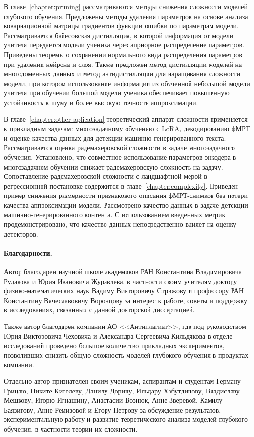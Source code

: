 В главе~\ref{chapter:pruning} рассматриваются методы снижения сложности моделей глубокого обучения.
Предложены методы удаления параметров на основе анализа ковариационной матрицы градиентов функции ошибки по параметрам модели.
Рассматривается байесовская дистилляция, в которой информация от модели учителя передается модели ученика через априорное распределение параметров. Приведены теоремы о сохранении нормального вида распределения параметров при удалении нейрона и слоя.
Также предложен метод дистилляции моделей на многодоменных данных и метод антидистилляции для наращивания сложности модели, при котором использование информации из обученной небольшой модели учителя при обучении большой модели ученика обеспечивает повышенную устойчивость к шуму и более высокую точность аппроксимации.

В главе~\ref{chapter:other-aplication} теоретический аппарат сложности применяется к прикладным задачам: многозадачному обучению с LoRA, декодированию фМРТ и оценке качества данных для детекции машинно-генерированного текста.
Рассматривается оценка радемахеровской сложности в задаче многозадачного обучения. Установлено, что совместное использование параметров энкодера в многозадачном обучении снижает радемахеровскую сложность на задачу.
Сопоставление радемахеровской сложности с ландшафтной мерой в регрессионной постановке содержится в главе~\ref{chapter:complexity}.
Приведен пример снижения размерности признакового описания фМРТ-снимков без потери качества аппроксимации модели.
Рассмотрено качество данных в задаче детекции машинно-генерированного контента. С использованием введенных метрик продемонстрировано, что качество данных непосредственно влияет на оценку детекторов.

\paragraph{Благодарности.}
Автор благодарен научной школе академиков РАН Константина Владимировича Рудакова и Юрия Ивановича Журавлева, в частности своим учителям доктору физико-математических наук Вадиму Викторовичу Стрижову и профессору РАН Константину Вячеславовичу Воронцову за интерес к работе, советы и поддержку в исследованиях, связанных с данной докторской диссертацией.

Также автор благодарен компании АО <<Антиплагиат>>, где под руководством Юрия Викторовича Чеховича и Александра Сергеевича Кильдякова в отделе исследований проведено большое количество прикладных экспериментов, позволивших снизить общую сложность моделей глубокого обучения в продуктах компании.

Отдельно автор признателен своим ученикам, аспирантам и студентам Герману Грицаю, Никите Киселеву, Данилу Дорину, Ильдару Хабутдинову, Владиславу Мешкову, Игорю Игнашину, Анастасии Вознюк, Анне Зверевой, Камилу Баязитову, Анне Ремизовой и Егору Петрову за обсуждение результатов, экспериментальную работу и развитие теоретического анализа моделей глубокого обучения, в частности теории их сложности.
